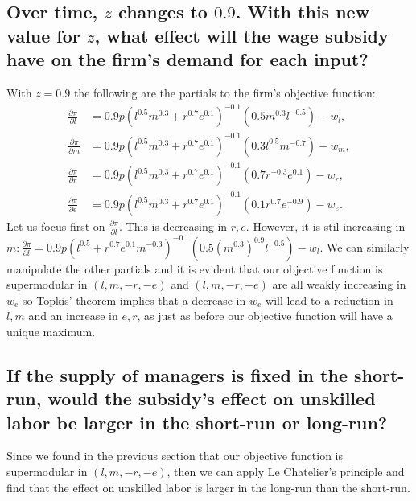 \documentclass[11pt]{article} %
\begin{document}
\subsection{Over time, $z$ changes to $0.9$. With this new value for $z$, what effect will the wage subsidy have on the firm's demand for each input?}
With $z = 0.9$ the following are the partials to the firm's objective function:
\begin{align*}
\frac{\partial \pi}{\partial l} &= 0.9p(l^{0.5}m^{0.3} + r^{0.7}e^{0.1})^{-0.1}(0.5m^{0.3}l^{-0.5}) - w_l, \\
\frac{\partial \pi}{\partial m} &= 0.9p(l^{0.5}m^{0.3} + r^{0.7}e^{0.1})^{-0.1}(0.3l^{0.5}m^{-0.7}) - w_m, \\
\frac{\partial \pi}{\partial r} &= 0.9p(l^{0.5}m^{0.3} + r^{0.7}e^{0.1})^{-0.1}(0.7r^{-0.3}e^{0.1}) - w_r, \\
\frac{\partial \pi}{\partial e} &= 0.9p(l^{0.5}m^{0.3} + r^{0.7}e^{0.1})^{-0.1}(0.1r^{0.7}e^{-0.9}) - w_e. 
\end{align*}
Let us focus first on $\frac{\partial \pi}{\partial l}.$ This is decreasing in $r,e$. However, it is stil increasing in $m: \frac{\partial \pi}{\partial l} = 0.9p(l^{0.5} + r^{0.7}e^{0.1}m^{-0.3})^{-0.1}(0.5(m^{0.3})^{0.9}l^{-0.5}) - w_l$. We can similarly manipulate the other partials and it is evident that our objective function is supermodular in $(l,m,-r,-e)$ and $(l,m,-r,-e)$ are all weakly increasing in $w_e$ so Topkis' theorem implies that a decrease in $w_e$ will lead to a reduction in $l,m$ and an increase in $e,r$, as just as before our objective function will have a unique maximum.
\subsection{If the supply of managers is fixed in the short-run, would the subsidy's effect on unskilled labor be larger in the short-run or long-run?}
Since we found in the previous section that our objective function is supermodular in $(l,m,-r,-e)$, then we can apply Le Chatelier's principle and find that the effect on unskilled labor is larger in the long-run than the short-run.
\end{document}
